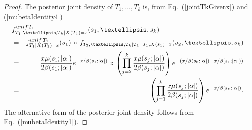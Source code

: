 \documentclass[10pt,a4paper]{amsart}
\begin{document}
\begin{proof}
The posterior joint density of $T_1, \ldots, T_k$ is, from Eq.~(\ref{jointTkGivenx}) and (\ref{mubetaIdentity4})  
\begin{eqnarray*}
\lefteqn{f_{T_1, \ldots, T_k \mid X(T_1) = x}^{{\rm unif}\,T_1}(s_1, \ldots, s_k)} \nonumber \\ 
	& = & f_{T_1 \mid X(T_1) = x}^{{\rm unif}\,T_1}(s_1) \times f_{T_2, \ldots, T_k \mid T_1 = s_1, X(s_1) = x}(s_2, \ldots, s_k) \nonumber \\
	& = & \frac{x\mu(s_1; |\alpha|)}{2\beta(s_1; |\alpha|)} e^{-x/\beta(s_1; |\alpha|)} 
			\times \left(\prod_{j = 2}^k \frac{x \mu(s_j; |\alpha|)}{2\beta(s_j; |\alpha|)} \right) e^{-(x/\beta(s_k; |\alpha|) - x/\beta(s_1; |\alpha|))} \nonumber \\
	& = & \left(\prod_{j = 1}^k \frac{x \mu(s_j; |\alpha|)}{2\beta(s_j; |\alpha|)} \right) e^{-x/\beta(s_k; |\alpha|)}.
\end{eqnarray*} 
The alternative form of the posterior joint density follows from Eq.~(\ref{mubetaIdentity1}).  
\end{proof}
\end{document}
